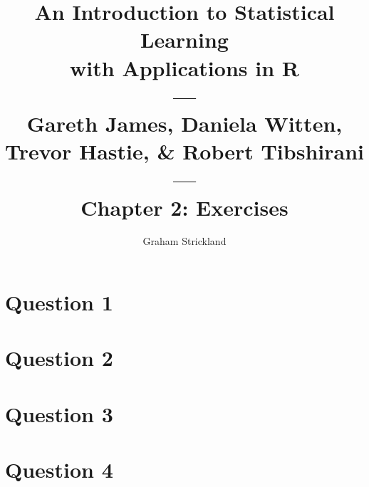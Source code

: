 \documentclass{article}
\title{
    An Introduction to Statistical Learning\\with Applications in R\\---\\
    Gareth James, Daniela Witten, Trevor Hastie, \& Robert Tibshirani\\---\\
    Chapter 2: Exercises
}
\author{Graham Strickland}
\begin{document}
\maketitle  

\section*{Question 1}


\section*{Question 2}


\section*{Question 3}


\section*{Question 4}

\end{document}
